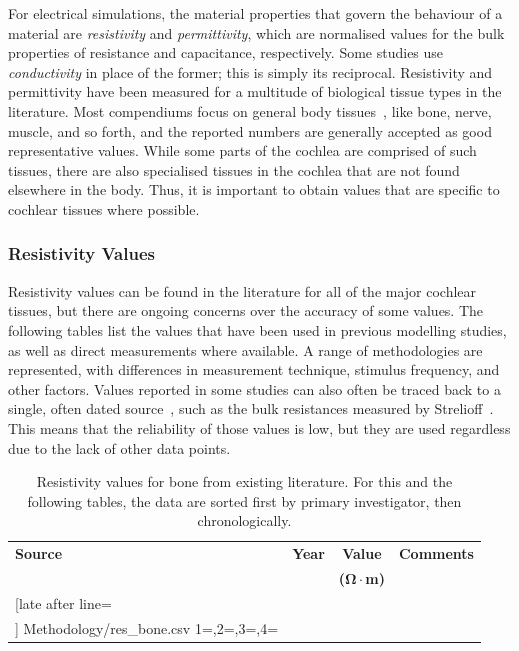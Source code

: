 For electrical simulations, the material properties that govern the behaviour of
a material are \emph{resistivity} and \emph{permittivity}, which are normalised
values for the bulk properties of resistance and capacitance, respectively. Some
studies use \emph{conductivity} in place of the former; this is simply its
reciprocal. Resistivity and permittivity have been measured for a multitude
of biological tissue types in the literature. Most compendiums focus on general
body tissues~\cite{geddes1967,gabriel1996a,gabriel1996b,gabriel1996c}, like
bone, nerve, muscle, and so forth, and the reported numbers are generally
accepted as good representative values. While some parts of the cochlea are
comprised of such tissues, there are also specialised tissues in the cochlea
that are not found elsewhere in the body. Thus, it is important to obtain
values that are specific to cochlear tissues where possible.

\subsubsection{Resistivity Values}

Resistivity values can be found in the literature for all of the major cochlear
tissues, but there are ongoing concerns over the accuracy of some values. The
following tables list the values that have been used in previous modelling
studies, as well as direct measurements where available. A range of
methodologies are represented, with differences in measurement technique,
stimulus frequency, and other factors. Values reported in some studies can also
often be traced back to a single, often dated source~\cite{micco2006}, such
as the bulk resistances measured by Strelioff~\cite{strelioff1973}. This means
that the reliability of those values is low, but they are used regardless due to
the lack of other data points.

\begin{table}
	\centering
	\sffamily
	\small
	\caption[Bone resistivity values]{Resistivity values for bone from existing
	literature. For this and the following tables, the data are sorted first by
	primary investigator, then chronologically.}
	\label{table:bone_res}
	
	\begin{tabularx}{0.9\textwidth}{p{2.6cm} c c X}
		\toprule
		\textbf{Source}	& \textbf{Year}	& \textbf{Value} & \textbf{Comments} \\
			& 	& \textbf{($ \mathsf{\boldsymbol{\Omega}} \cdot $m)} & \\
		\midrule
		
		\csvreader[late after line=\\]%
			{Methodology/res_bone.csv}%
			{1=\src,2=\year,3=\val,4=\comm}%
 			{\src & \year & \val & \comm}%
		\bottomrule
	\end{tabularx}
	
\end{table}

